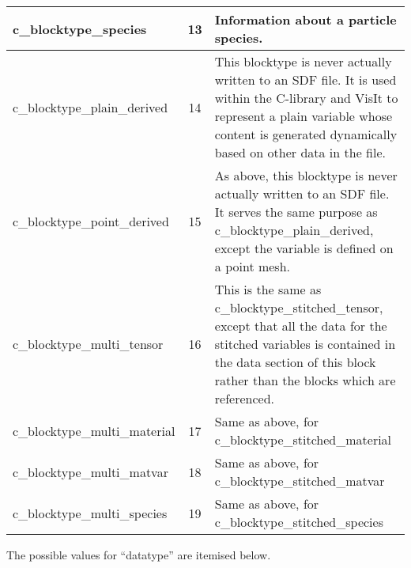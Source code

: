 \documentclass[12pt]{article}
\begin{document}
\begin{center}
\begin{tabularx}{0.9\textwidth}[!hbt]{lcX}
  c\_blocktype\_species & 13 & Information about a particle species.
  \\\midrule

  c\_blocktype\_plain\_derived & 14 & This blocktype is never actually written
  to an SDF file. It is used within the C-library and VisIt to represent a
  plain variable whose content is generated dynamically based on other data in
  the file.
  \\\midrule

  c\_blocktype\_point\_derived & 15 & As above, this blocktype is never
  actually written to an SDF file. It serves the same purpose as
  c\_blocktype\_plain\_derived, except the variable is defined on a point mesh.
  \\\midrule

  c\_blocktype\_multi\_tensor & 16 & This is the same as
  c\_blocktype\_stitched\_tensor, except that all the data for the stitched
  variables is contained in the data section of this block rather than the
  blocks which are referenced.
  \\\midrule

  c\_blocktype\_multi\_material & 17 & Same as above, for
  c\_blocktype\_stitched\_material
  \\\midrule

  c\_blocktype\_multi\_matvar & 18 & Same as above, for
  c\_blocktype\_stitched\_matvar
  \\\midrule

  c\_blocktype\_multi\_species & 19 & Same as above, for
  c\_blocktype\_stitched\_species
\end{tabularx}
\end{center}\vspace{10pt}

The possible values for ``datatype'' are itemised below.\\
\end{document}
